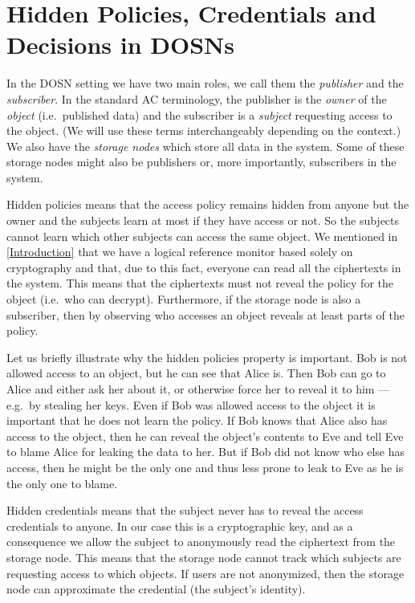 \section{Hidden Policies, Credentials and Decisions in 
  \acsp{DOSN}}\label{HiddenPCD}

In the \ac{DOSN} setting we have two main roles, we call them the 
\emph{publisher} and the \emph{subscriber}.
In the standard \ac{AC} terminology, the publisher is the \emph{owner} of the 
\emph{object} (i.e.\ published data) and the subscriber is a \emph{subject} 
requesting access to the object.
(We will use these terms interchangeably depending on the context.)
We also have the \emph{storage nodes} which store all data in the system.
Some of these storage nodes might also be publishers or, more importantly, 
subscribers in the system.

Hidden policies means that the access policy remains hidden from anyone but the 
owner and the subjects learn at most if they have access or not.
So the subjects cannot learn which other subjects can access the same object.
We mentioned in \cref{Introduction} that we have a logical reference monitor 
based solely on cryptography and that, due to this fact, everyone can read all 
the ciphertexts in the system.
This means that the ciphertexts must not reveal the policy for the object 
(i.e.\ who can decrypt).
Furthermore, if the storage node is also a subscriber, then by observing who 
accesses an object reveals at least parts of the policy.

Let us briefly illustrate why the hidden policies property is important.
Bob is not allowed access to an object, but he can see that Alice is.
Then Bob can go to Alice and either ask her about it, or otherwise force her to 
reveal it to him --- e.g.\ by stealing her keys.
Even if Bob was allowed access to the object it is important that he does not 
learn the policy.
If Bob knows that Alice also has access to the object, then he can reveal the 
object's contents to Eve and tell Eve to blame Alice for leaking the data to 
her.
But if Bob did not know who else has access, then he might be the only one and 
thus less prone to leak to Eve as he is the only one to blame.

Hidden credentials means that the subject never has to reveal the access 
credentials to anyone.
In our case this is a cryptographic key, and as a consequence we allow the 
subject to anonymously read the ciphertext from the storage node.
This means that the storage node cannot track which subjects are requesting 
access to which objects.
If users are not anonymized, then the storage node can approximate the 
credential (the subject's identity).

